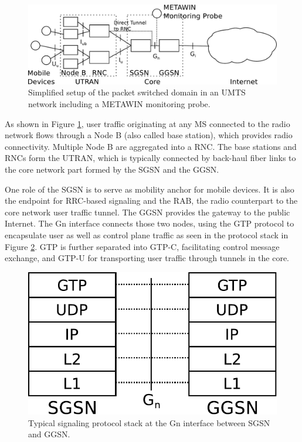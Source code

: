 \begin{figure}[htbp]
	\centering
	\includegraphics[width=1.0\textwidth]{images/umts-network.pdf}
	\caption{Simplified setup of the packet switched domain in an \acs{UMTS} network including a METAWIN monitoring probe.}
	\label{c4:fig:umtsnetwork}
\end{figure}

As shown in Figure \ref{c4:fig:umtsnetwork}, user traffic originating at any \ac{MS} connected to the radio network flows through a Node B (also called base station), which provides radio connectivity. Multiple Node B are aggregated into a \ac{RNC}. The base stations and \acp{RNC} form the \ac{UTRAN}, which is typically connected by back-haul fiber links to the core network part formed by the \ac{SGSN} and the \ac{GGSN}.

One role of the \ac{SGSN} is to serve as mobility anchor for mobile devices. It is also the endpoint for \ac{RRC}-based signaling and the \ac{RAB}, the radio counterpart to the core network user traffic tunnel. The \ac{GGSN} provides the gateway to the public Internet. The Gn interface connects those two nodes, using the \ac{GTP} protocol to encapsulate user as well as control plane traffic as seen in the protocol stack in Figure \ref{c4:fig:signallingstack}. \ac{GTP} is further separated into GTP-C, facilitating control message exchange, and GTP-U for transporting user traffic through tunnels in the core.

\begin{figure}[htbp]
	\centering
	\includegraphics[width=0.6\columnwidth]{images/signalling-stack.pdf}
	\caption{Typical signaling protocol stack at the Gn interface between \ac{SGSN} and \ac{GGSN}.}
	\label{c4:fig:signallingstack}
\end{figure}



